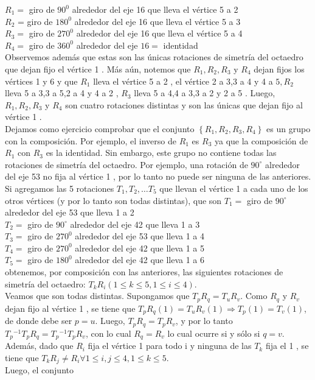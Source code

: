 \documentclass[10pt]{article}
\begin{document}
$R_{1}=$ giro de $90^{0}$ alrededor del eje 16 que lleva el vértice 5 a 2\\
$R_{2}$ = giro de $180^{0}$ alrededor del eje 16 que lleva el vértice 5 a 3\\
$R_{3}=$ giro de $270^{0}$ alrededor del eje 16 que lleva el vértice 5 a 4\\
$R_{4}=$ giro de $360^{0}$ alrededor del eje $16=$ identidad\\
Observemos además que estas son las únicas rotaciones de simetría del octaedro que dejan fijo el vértice 1 . Más aún, notemos que $R_{1}, R_{2}, R_{3}$ y $R_{4}$ dejan fijos los vértices 1 y 6 y que $R_{1}$ lleva el vértice 5 a 2 , el vértice 2 a 3,3 a 4 y 4 a $5, R_{2}$ lleva 5 a 3,3 a 5,2 a 4 y 4 a 2 , $R_{3}$ lleva 5 a 4,4 a 3,3 a 2 y 2 a 5 . Luego, $R_{1}, R_{2}, R_{3}$ y $R_{4}$ son cuatro rotaciones distintas y son las únicas que dejan fijo al vértice 1 .\\
Dejamos como ejercicio comprobar que el conjunto $\left\{R_{1}, R_{2}, R_{3}, R_{4}\right\}$ es un grupo con la composición. Por ejemplo, el inverso de $R_{1}$ es $R_{3}$ ya que la composición de $R_{1}$ con $R_{3}$ es la identidad. Sin embargo, este grupo no contiene todas las rotaciones de simetría del octaedro. Por ejemplo, una rotación de $90^{\circ}$ alrededor del eje 53 no fija al vértice 1 , por lo tanto no puede ser ninguna de las anteriores.\\
Si agregamos las 5 rotaciones $T_{1}, T_{2}, \ldots T_{5}$ que llevan el vértice 1 a cada uno de los otros vértices (y por lo tanto son todas distintas), que son $T_{1}=$ giro de $90^{\circ}$ alrededor del eje 53 que lleva 1 a 2\\
$T_{2}=$ giro de $90^{\circ}$ alrededor del eje 42 que lleva 1 a 3\\
$T_{3}=$ giro de $270^{0}$ alrededor del eje 53 que lleva 1 a 4\\
$T_{4}=$ giro de $270^{0}$ alrededor del eje 42 que lleva 1 a 5\\
$T_{5}=$ giro de $180^{0}$ alrededor del eje 42 que lleva 1 a 6\\
obtenemos, por composición con las anteriores, las siguientes rotaciones de simetría del octaedro: $T_{k} R_{i}(1 \leq k \leq 5,1 \leq i \leq 4)$.\\
Veamos que son todas distintas. Supongamos que $T_{p} R_{q}=T_{u} R_{v}$. Como $R_{q}$ y $R_{v}$ dejan fijo al vértice 1 , se tiene que $T_{p} R_{q}(1)=T_{u} R_{v}(1) \Longrightarrow T_{p}(1)=T_{v}(1)$, de donde debe ser $p=u$. Luego, $T_{p} R_{q}=T_{p} R_{v}$, y por lo tanto $T_{p}{ }^{-1} T_{p} R_{q}=T_{p}{ }^{-1} T_{p} R_{v}$, con lo cual $R_{q}=R_{v}$ lo cual ocurre si y sólo si $q=v$.\\
Además, dado que $R_{i}$ fija el vértice 1 para todo i y ninguna de las $T_{k}$ fija el 1 , se tiene que $T_{k} R_{j} \neq R_{i} \forall 1 \leq i, j \leq 4,1 \leq k \leq 5$.\\
Luego, el conjunto
\end{document}
